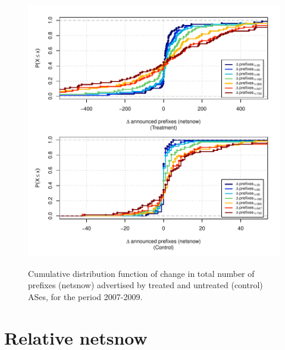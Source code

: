 \clearpage
\vspace*{16pt}
\begin{figure}[H]
\begin{centering}
\begin{singlespace}
\captionsetup{list=no}
    \includegraphics[width=6in]{figures/behavior-netsnow-2007_2009-corr.pdf}
    \vspace{-2em}\\
    \caption{Cumulative distribution function of change in total number of
    prefixes (netsnow) advertised by treated and untreated (control) ASes, for
    the period 2007-2009.}
\end{singlespace}
\end{centering}
\end{figure}


\clearpage
\section{Relative netsnow}

